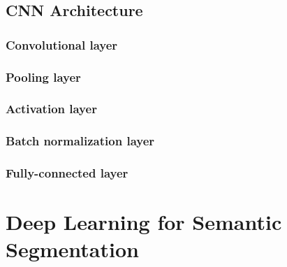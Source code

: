 \subsection{CNN Architecture}

\subsubsection{Convolutional layer}

\subsubsection{Pooling layer}

\subsubsection{Activation layer}

\subsubsection{Batch normalization layer}

\subsubsection{Fully-connected layer}

\section{Deep Learning for Semantic Segmentation}

